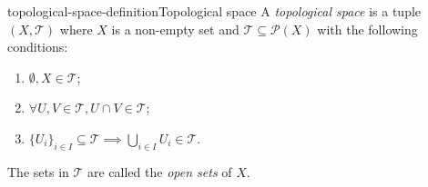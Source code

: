 \documentclass[preview]{standalone}
\begin{document}
\genpage

\begin{snippetdefinition}{topological-space-definition}{Topological space}
    A \textit{topological space} is a tuple \((X, \mathcal{T})\)
    where \(X\) is a non-empty set and \(\mathcal{T} \subseteq \mathcal{P}(X)\)
    with the following conditions:
    \begin{enumerate}
        \item \(\emptyset, X \in \mathcal{T}\);
        \item \(\forall U, V \in \mathcal{T}, U \cap V \in \mathcal{T}\);
        \item \({\{U_i\}}_{i \in I} \subseteq \mathcal{T} \implies \bigcup_{i \in I} U_i \in \mathcal{T}\).
    \end{enumerate}
    The sets in \(\mathcal{T}\) are called the \textit{open sets} of \(X\).
\end{snippetdefinition}

\end{document}
